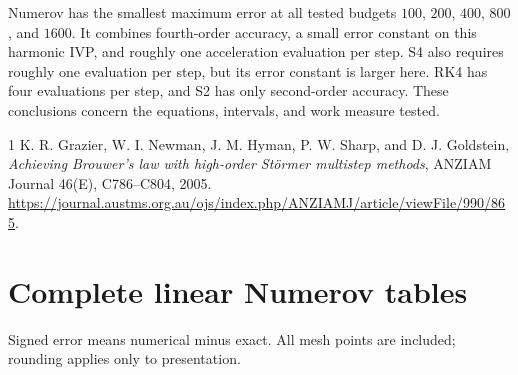 \documentclass[11pt,a4paper]{article}
\begin{document}
Numerov has the smallest maximum error at all tested budgets $100$, $200$, $400$, $800$, and $1600$. It combines fourth-order accuracy, a small error constant on this harmonic IVP, and roughly one acceleration evaluation per step. S4 also requires roughly one evaluation per step, but its error constant is larger here. RK4 has four evaluations per step, and S2 has only second-order accuracy. These conclusions concern the equations, intervals, and work measure tested.
\clearpage
\begin{thebibliography}{1}
 K. R. Grazier, W. I. Newman, J. M. Hyman,
P. W. Sharp, and D. J. Goldstein,
\emph{Achieving Brouwer's law with high-order St\"ormer multistep methods},
ANZIAM Journal 46(E), C786--C804, 2005.
\url{https://journal.austms.org.au/ojs/index.php/ANZIAMJ/article/viewFile/990/865}.
\end{thebibliography}
\appendix
\clearpage
\section{Complete linear Numerov tables}
Signed error means numerical minus exact. All mesh points are included;
rounding applies only to presentation.
\end{document}
